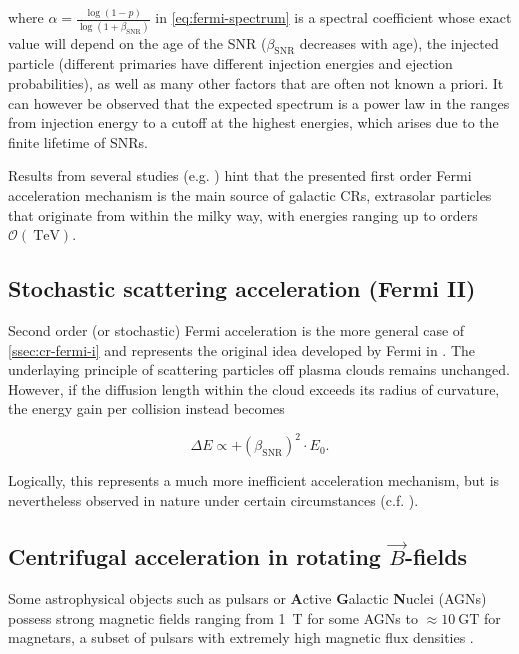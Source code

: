 where $\alpha = \frac{\log(1 - p)}{\log(1 + \beta_\text{SNR})}$ in \autoref{eq:fermi-spectrum} is a spectral coefficient whose exact value will depend on the age 
of the SNR ($\beta_\text{SNR}$ decreases with age), the injected particle (different primaries have different injection energies and ejection probabilities), as 
well as many other factors that are often not known a priori. It can however be observed that the expected spectrum is a power law in the ranges from injection energy 
to a cutoff at the highest energies, which arises due to the finite lifetime of SNRs.

Results from several studies (e.g. \cite{aab2015searches, hillas2005can, blasi2013origin}) hint that the presented first order Fermi acceleration mechanism is the 
main source of galactic CRs, extrasolar particles that originate from within the milky way, with energies ranging up to orders 
$\mathcal{O}(\SI{}{\tera\electronvolt})$.

\subsection{Stochastic scattering acceleration (Fermi II)}
\label{ssec:cr-fermi-ii}

Second order (or stochastic) Fermi acceleration is the more general case of \autoref{ssec:cr-fermi-i} and represents the original idea developed by Fermi in 
\cite{fermi1949origin}. The underlaying principle of scattering particles off plasma clouds remains unchanged. However, if the diffusion length within the cloud 
exceeds its radius of curvature, the energy gain per collision instead becomes

\begin{equation}
\Delta E \propto + \left( \beta_\text{SNR}\right)^2 \cdot E_0.
\end{equation}

Logically, this represents a much more inefficient acceleration mechanism, but is nevertheless observed in nature under certain circumstances (c.f. 
\cite{asano2015most}).

\subsection{Centrifugal acceleration in rotating $\vec{B}$-fields}
\label{ssec:cr-centrifugal-acceleration}

Some astrophysical objects such as pulsars or \textbf{A}ctive \textbf{G}alactic \textbf{N}uclei (AGNs) possess strong magnetic fields ranging from \SI{1}{\tesla}
for some AGNs \cite{daly2019black} to $\approx\SI{10}{\giga\tesla}$ for magnetars, a subset of pulsars with extremely high magnetic flux densities 
\cite{flowers1977evolution}.

